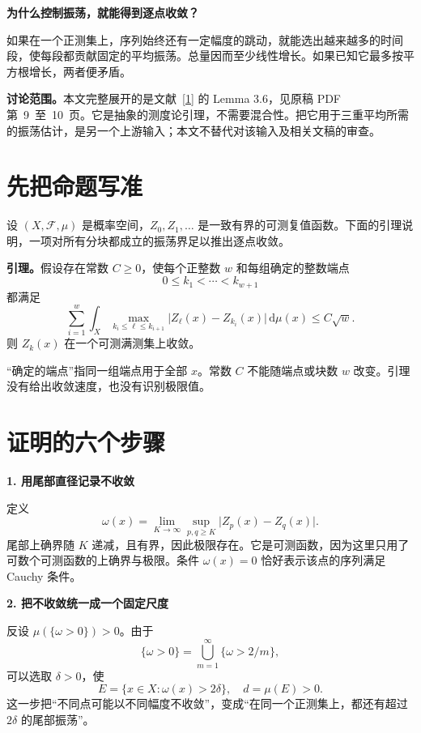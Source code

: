 \documentclass[12pt,a4paper]{article}
\newcommand{\step}[1]{\par\addvspace{0.65em}\Needspace{5\baselineskip}\noindent\textbf{#1}\par\nobreak}
\newcommand{\dd}{\,\mathrm{d}}
\begin{document}
\begin{center}
{\sffamily\bfseries\Large 为什么控制振荡，就能得到逐点收敛？}
\end{center}
\vspace{0.2em}

如果在一个正测集上，序列始终还有一定幅度的跳动，就能选出越来越多的时间段，使每段都贡献固定的平均振荡。总量因而至少线性增长。如果已知它最多按平方根增长，两者便矛盾。

\noindent\textbf{讨论范围。}本文完整展开的是文献~\hyperref[ref:source]{[1]} 的 Lemma 3.6，见原稿 PDF 第~9~至~10~页。它是抽象的测度论引理，不需要混合性。把它用于三重平均所需的振荡估计，是另一个上游输入；本文不替代对该输入及相关文稿的审查。

\section{先把命题写准}
设 $(X,\mathcal F,\mu)$ 是概率空间，$Z_0,Z_1,\ldots$ 是一致有界的可测复值函数。下面的引理说明，一项对所有分块都成立的振荡界足以推出逐点收敛。

\noindent\textbf{引理。}假设存在常数 $C\geq0$，使每个正整数 $w$ 和每组确定的整数端点
\[
0\leq k_1<\cdots<k_{w+1}
\]
都满足
\begin{equation}\label{eq:oscillation}
\sum_{i=1}^{w}\int_X
\max_{k_i\leq\ell\leq k_{i+1}}
\lvert Z_\ell(x)-Z_{k_i}(x)\rvert\dd\mu(x)
\leq C\sqrt w.
\end{equation}
则 $Z_k(x)$ 在一个可测满测集上收敛。

“确定的端点”指同一组端点用于全部 $x$。常数 $C$ 不能随端点或块数 $w$ 改变。引理没有给出收敛速度，也没有识别极限值。

\section{证明的六个步骤}
\step{1. 用尾部直径记录不收敛}
定义
\begin{equation}\label{eq:omega}
\omega(x)=\lim_{K\to\infty}\sup_{p,q\geq K}
\lvert Z_p(x)-Z_q(x)\rvert.
\end{equation}
尾部上确界随 $K$ 递减，且有界，因此极限存在。它是可测函数，因为这里只用了可数个可测函数的上确界与极限。条件 $\omega(x)=0$ 恰好表示该点的序列满足 Cauchy 条件。

\step{2. 把不收敛统一成一个固定尺度}
反设 $\mu(\{\omega>0\})>0$。由于
\[
\{\omega>0\}=\bigcup_{m=1}^{\infty}\{\omega>2/m\},
\]
可以选取 $\delta>0$，使
\[
E=\{x\in X:\omega(x)>2\delta\},\quad d=\mu(E)>0.
\]
这一步把“不同点可能以不同幅度不收敛”，变成“在同一个正测集上，都还有超过 $2\delta$ 的尾部振荡”。
\end{document}
